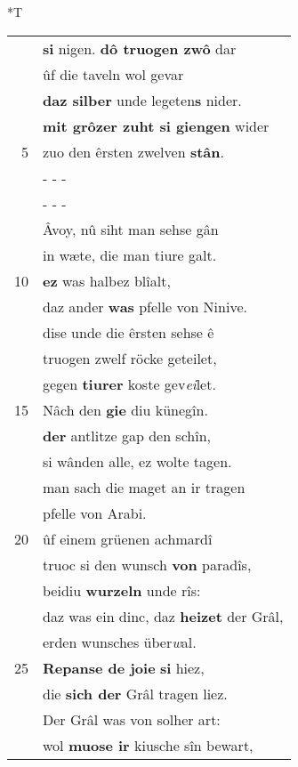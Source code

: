 \documentclass[8pt,a4paper,notitlepage]{article}
\begin{document}
\begin{table}[ht]
\begin{minipage}[t]{0.5\linewidth}
\end{minipage}
\hspace{0.5cm}
\begin{minipage}[t]{0.5\linewidth}
\small
\begin{center}*T
\end{center}
\begin{tabular}{rl}
 & \textbf{si} nigen. \textbf{dô truogen zwô} dar\\ 
 & ûf die taveln wol gevar\\ 
 & \textbf{daz silber} unde legeten\textbf{s} nider.\\ 
 & \textbf{mit grôzer zuht si giengen} wider\\ 
5 & zuo den êrsten zwelven \textbf{stân}.\\ 
 & \multicolumn{1}{l}{ - - - }\\ 
 & \multicolumn{1}{l}{ - - - }\\ 
 & Âvoy, nû siht man sehse gân\\ 
 & in wæte, die man tiure galt.\\ 
10 & \textbf{ez} was halbez blîalt,\\ 
 & daz ander \textbf{was} pfelle von Ninive.\\ 
 & dise unde die êrsten sehse ê\\ 
 & truogen zwelf röcke geteilet,\\ 
 & gegen \textbf{tiurer} koste gev\textit{ei}let.\\ 
15 & Nâch den \textbf{gie} diu künegîn.\\ 
 & \textbf{der} antlitze gap den schîn,\\ 
 & si wânden alle, ez wolte tagen.\\ 
 & man sach die maget an ir tragen\\ 
 & pfelle von Arabi.\\ 
20 & ûf einem grüenen achmardî\\ 
 & truoc si den wunsch \textbf{von} paradîs,\\ 
 & beidiu \textbf{wurzeln} unde rîs:\\ 
 & daz was ein dinc, daz \textbf{heizet} der Grâl,\\ 
 & erden wunsches über\textit{w}al.\\ 
25 & \textbf{Repanse de joie} \textbf{si} hiez,\\ 
 & die \textbf{sich der} Grâl tragen liez.\\ 
 & Der Grâl was von solher art:\\ 
 & wol \textbf{muose ir} kiusche sîn bewart,\\ 

\end{tabular}
\end{minipage}
\end{table}
\end{document}
